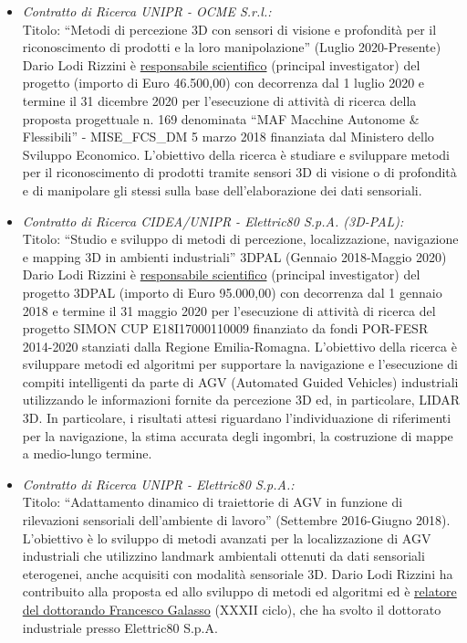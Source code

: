\documentclass[11pt]{article}
\newcommand{\ITEMDATE}[1]{\item \textit{#1:}\\}
\begin{document}
\begin{itemize}

\ITEMDATE{Contratto di Ricerca UNIPR - OCME S.r.l.} 
Titolo: ``Metodi di percezione 3D con sensori di visione e profondit\`a per il riconoscimento di prodotti e la loro manipolazione'' (Luglio 2020-Presente)
Dario Lodi Rizzini \`e \underline{responsabile scientifico} (principal investigator) del progetto (importo di Euro 46.500,00) con decorrenza dal 1 luglio 2020 e termine 
il 31 dicembre 2020 per l'esecuzione di attivit\`a di ricerca della proposta progettuale n. 169 denominata ``MAF Macchine Autonome \& Flessibili'' - MISE\_FCS\_DM 5 marzo 2018 finanziata dal Ministero dello Sviluppo Economico. 
L'obiettivo della ricerca \`e studiare e sviluppare metodi per il riconoscimento di prodotti tramite sensori 3D di visione o di profondit\`a e di manipolare gli stessi sulla base dell’elaborazione dei dati sensoriali. 

\ITEMDATE{Contratto di Ricerca CIDEA/UNIPR - Elettric80 S.p.A. (3D-PAL)} 
Titolo: ``Studio e sviluppo di metodi di percezione, localizzazione, navigazione e mapping 3D in ambienti industriali'' 3DPAL (Gennaio 2018-Maggio 2020)
Dario Lodi Rizzini \`e \underline{responsabile scientifico} (principal investigator) del progetto 3DPAL (importo di Euro 95.000,00) con decorrenza dal 1 gennaio 2018 e termine 
il 31 maggio 2020 per l'esecuzione di attivit\`a di ricerca del progetto SIMON CUP E18I17000110009 finanziato da fondi POR-FESR 2014-2020 
stanziati dalla Regione Emilia-Romagna. 
L'obiettivo della ricerca \`e sviluppare metodi ed algoritmi per supportare la navigazione e l'esecuzione di compiti intelligenti
da parte di AGV (Automated Guided Vehicles) industriali utilizzando le informazioni fornite da percezione 3D ed, in particolare, LIDAR 3D. 
In particolare, i risultati attesi riguardano l'individuazione di riferimenti per la navigazione, la stima accurata degli ingombri, 
la costruzione di mappe a medio-lungo termine. 

\ITEMDATE{Contratto di Ricerca UNIPR - Elettric80 S.p.A.} 
Titolo: ``Adattamento dinamico di traiettorie di AGV in funzione di rilevazioni sensoriali dell'ambiente di lavoro'' (Settembre 2016-Giugno 2018). 
L'obiettivo \`e lo sviluppo di metodi avanzati per la localizzazione di AGV industriali 
che utilizzino landmark ambientali ottenuti da dati sensoriali eterogenei, anche acquisiti con modalit\`a sensoriale 3D. 
Dario Lodi Rizzini ha contribuito alla proposta ed allo sviluppo di metodi ed algoritmi 
ed \`e \ul{relatore del dottorando Francesco Galasso} (XXXII ciclo), che ha svolto il dottorato industriale presso Elettric80 S.p.A.


\end{itemize}
\end{document}
